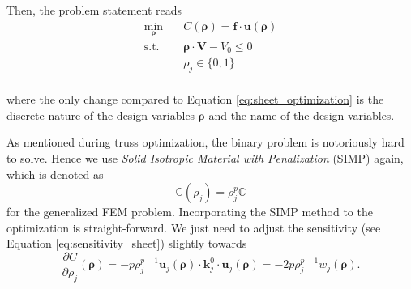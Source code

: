 Then, the problem statement reads
\begin{equation}
    \begin{aligned}
        \min_{\pmb{\rho}} \quad & C(\pmb{\rho}) = \mathbf{f} \cdot \mathbf{u}(\pmb{\rho})\\
        \textrm{s.t.} \quad & \pmb{\rho} \cdot \mathbf{V} - V_0 \le 0  \\
                            & \rho_j \in \{0, 1\}\\
    \end{aligned}
    \label{eq:topology_optimization}
\end{equation}

where the only change compared to Equation \eqref{eq:sheet_optimization} is the discrete nature of the design variables $\pmb{\rho}$ and the name of the design variables. 


As mentioned during truss optimization, the binary problem is notoriously hard to solve. Hence we use \emph{Solid Isotropic Material with Penalization} (SIMP) again, which is denoted as 
\begin{equation}
    \mathbb{C}(\rho_j)= \rho_j^p \mathbb{C}
\end{equation}
for the generalized FEM problem. Incorporating the SIMP method to the optimization is straight-forward. We just need to adjust the sensitivity (see Equation \ref{eq:sensitivity_sheet}) slightly towards
\begin{equation}
    \frac{\partial C}{\partial \rho_j} (\pmb{\rho}) = - p \rho_j^{p-1} \mathbf{u}_j(\pmb{\rho})  \cdot \mathbf{k}^0_j \cdot \mathbf{u}_j(\pmb{\rho}) = -2 p \rho_j^{p-1} w_j(\pmb{\rho}).
    \label{eq:sensitivity_topology}
\end{equation}

